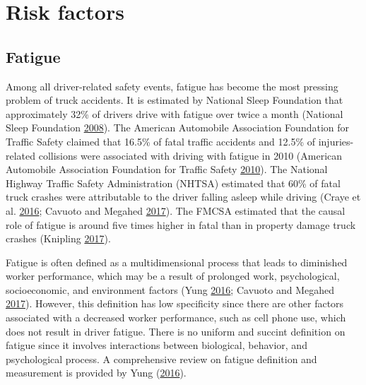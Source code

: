 \documentclass[12pt]{book}
\numberwithin{equation}{chapter}
\begin{document}
\hypertarget{risk-factors}{%
\section{Risk factors}\label{risk-factors}}

\hypertarget{fatigue}{%
\subsection{Fatigue}\label{fatigue}}

Among all driver-related safety events, fatigue has become the most pressing problem of truck accidents. It is estimated by National Sleep Foundation that approximately 32\% of drivers drive with fatigue over twice a month (National Sleep Foundation \protect\hyperlink{ref-nsleepf}{2008}). The American Automobile Association Foundation for Traffic Safety claimed that 16.5\% of fatal traffic accidents and 12.5\% of injuries-related collisions were associated with driving with fatigue in 2010 (American Automobile Association Foundation for Traffic Safety \protect\hyperlink{ref-aaafoundation}{2010}). The National Highway Traffic Safety Administration (NHTSA) estimated that 60\% of fatal truck crashes were attributable to the driver falling asleep while driving (Craye et al. \protect\hyperlink{ref-craye2016multi}{2016}; Cavuoto and Megahed \protect\hyperlink{ref-cavuoto2017understanding}{2017}). The FMCSA estimated that the causal role of fatigue is around five times higher in fatal than in property damage truck crashes (Knipling \protect\hyperlink{ref-knipling2017threats}{2017}).

Fatigue is often defined as a multidimensional process that leads to diminished worker performance, which may be a result of prolonged work, psychological, socioeconomic, and environment factors (Yung \protect\hyperlink{ref-yung2016fatigue}{2016}; Cavuoto and Megahed \protect\hyperlink{ref-cavuoto2017understanding}{2017}). However, this definition has low specificity since there are other factors associated with a decreased worker performance, such as cell phone use, which does not result in driver fatigue. There is no uniform and succint definition on fatigue since it involves interactions between biological, behavior, and psychological process. A comprehensive review on fatigue definition and measurement is provided by Yung (\protect\hyperlink{ref-yung2016fatigue}{2016}).
\end{document}
